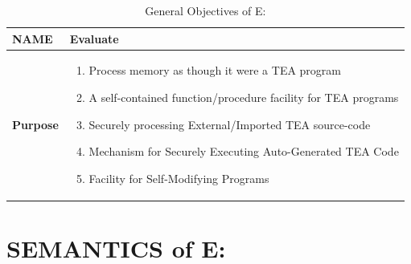 \documentclass[a4paper, 18pt]{book} %
\begin{document}
\begin{table}[H]
  \centering
  \LARGE
	\begin{tabular}[t]{|p{}|p{}}
 
	\textbf{NAME} & Evaluate\\
	\hline
	\textbf{Purpose} & \begin{enumerate}
	\item Process memory as though it were a TEA program
	\item A self-contained function/procedure facility for TEA programs
	\item Securely processing External/Imported TEA source-code
	\item Mechanism for Securely Executing Auto-Generated TEA Code
	\item Facility for Self-Modifying Programs
	\end{enumerate}\\
	\hline
	              
\end{tabular}
\caption{General Objectives of E:}
  \label{TABTAZE}
\end{table}




\section{SEMANTICS of E:}
\label{SECSEME}
\end{document}

